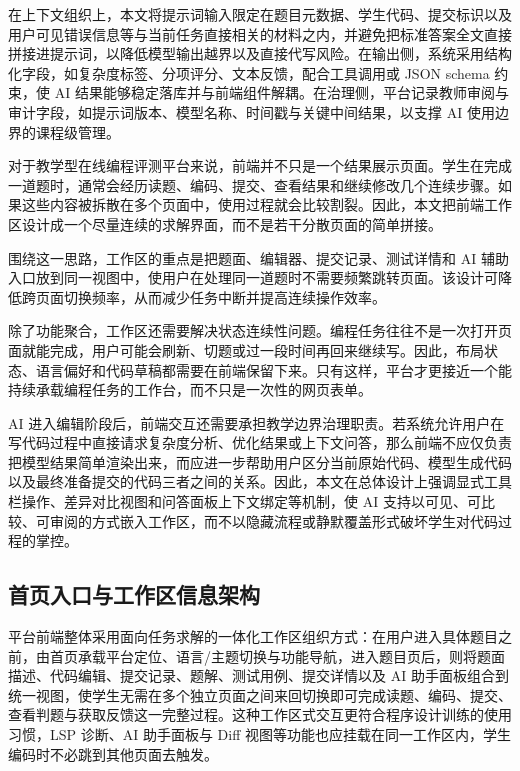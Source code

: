 在上下文组织上，本文将提示词输入限定在题目元数据、学生代码、提交标识以及用户可见错误信息等与当前任务直接相关的材料之内，并避免把标准答案全文直接拼接进提示词，以降低模型输出越界以及直接代写风险\cite{jacobs2024feedback,koutcheme2024evaluatinglm,raihan2025llmcsed}。在输出侧，系统采用结构化字段，如复杂度标签、分项评分、文本反馈，配合工具调用或 JSON schema 约束，使 AI 结果能够稳定落库并与前端组件解耦\cite{pankiewicz2023icce}。在治理侧，平台记录教师审阅与审计字段，如提示词版本、模型名称、时间戳与关键中间结果，以支撑 AI 使用边界的课程级管理\cite{lubin2025llm,messer2024automated}。

对于教学型在线编程评测平台来说，前端并不只是一个结果展示页面。学生在完成一道题时，通常会经历读题、编码、提交、查看结果和继续修改几个连续步骤。如果这些内容被拆散在多个页面中，使用过程就会比较割裂。因此，本文把前端工作区设计成一个尽量连续的求解界面，而不是若干分散页面的简单拼接。

围绕这一思路，工作区的重点是把题面、编辑器、提交记录、测试详情和 AI 辅助入口放到同一视图中，使用户在处理同一道题时不需要频繁跳转页面。该设计可降低跨页面切换频率，从而减少任务中断并提高连续操作效率。

除了功能聚合，工作区还需要解决状态连续性问题。编程任务往往不是一次打开页面就能完成，用户可能会刷新、切题或过一段时间再回来继续写。因此，布局状态、语言偏好和代码草稿都需要在前端保留下来。只有这样，平台才更接近一个能持续承载编程任务的工作台，而不只是一次性的网页表单。

AI 进入编辑阶段后，前端交互还需要承担教学边界治理职责。若系统允许用户在写代码过程中直接请求复杂度分析、优化结果或上下文问答，那么前端不应仅负责把模型结果简单渲染出来，而应进一步帮助用户区分当前原始代码、模型生成代码以及最终准备提交的代码三者之间的关系。因此，本文在总体设计上强调显式工具栏操作、差异对比视图和问答面板上下文绑定等机制，使 AI 支持以可见、可比较、可审阅的方式嵌入工作区，而不以隐藏流程或静默覆盖形式破坏学生对代码过程的掌控。

\subsection{首页入口与工作区信息架构}

平台前端整体采用面向任务求解的一体化工作区组织方式：在用户进入具体题目之前，由首页承载平台定位、语言/主题切换与功能导航，进入题目页后，则将题面描述、代码编辑、提交记录、题解、测试用例、提交详情以及 AI 助手面板组合到统一视图，使学生无需在多个独立页面之间来回切换即可完成读题、编码、提交、查看判题与获取反馈这一完整过程。这种工作区式交互更符合程序设计训练的使用习惯，LSP 诊断、AI 助手面板与 Diff 视图等功能也应挂载在同一工作区内，学生编码时不必跳到其他页面去触发。

